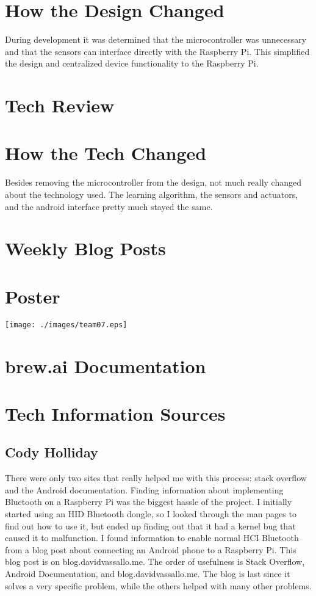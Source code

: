\documentclass[draftclsnofoot,onecolumn,letterpaper,10pt]{IEEEtran}
\begin{document}
\section{How the Design Changed}

During development it was determined that the microcontroller was unnecessary and that the sensors can interface directly with the Raspberry Pi.
This simplified the design and centralized device functionality to the Raspberry Pi.

\section{Tech Review}


\section{How the Tech Changed}
Besides removing the microcontroller from the design, not much really changed about the technology used.
The learning algorithm, the sensors and actuators, and the android interface pretty much stayed the same.

\section{Weekly Blog Posts}



\section{Poster}
\newpage
\vfill
\begin{sidewaysfigure}[ht]
\texttt{[image: ./images/team07.eps]}
\end{sidewaysfigure}
\vfill
\clearpage


\section{brew.ai Documentation}

\section{Tech Information Sources}
\subsection{Cody Holliday}
There were only two sites that really helped me with this process: stack overflow and the Android documentation.
Finding information about implementing Bluetooth on a Raspberry Pi was the biggest hassle of the project.
I initially started using an HID Bluetooth dongle, so I looked through the man pages to find out how to use it, but ended up finding out that it had a kernel bug that caused it to malfunction.
I found information to enable normal HCI Bluetooth from a blog post about connecting an Android phone to a Raspberry Pi.
This blog post is on blog.davidvassallo.me.
The order of usefulness is Stack Overflow, Android Documentation, and blog.davidvassallo.me.
The blog is last since it solves a very specific problem, while the others helped with many other problems.
\end{document}

